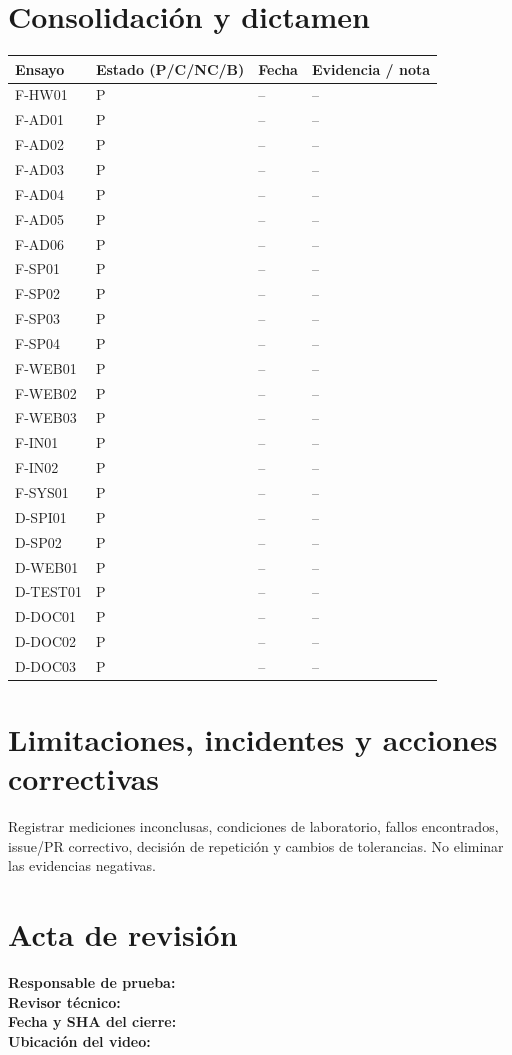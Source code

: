 \documentclass[11pt,a4paper]{article}
\begin{document}
\section{Consolidación y dictamen}
\begin{longtable}{p{20mm}p{24mm}p{20mm}p{72mm}}\toprule
Ensayo & Estado (P/C/NC/B) & Fecha & Evidencia / nota\\\midrule\endhead
F-HW01 & P & -- & --\\
F-AD01 & P & -- & --\\
F-AD02 & P & -- & --\\
F-AD03 & P & -- & --\\
F-AD04 & P & -- & --\\
F-AD05 & P & -- & --\\
F-AD06 & P & -- & --\\
F-SP01 & P & -- & --\\
F-SP02 & P & -- & --\\
F-SP03 & P & -- & --\\
F-SP04 & P & -- & --\\
F-WEB01 & P & -- & --\\
F-WEB02 & P & -- & --\\
F-WEB03 & P & -- & --\\
F-IN01 & P & -- & --\\
F-IN02 & P & -- & --\\
F-SYS01 & P & -- & --\\
D-SPI01 & P & -- & --\\
D-SP02 & P & -- & --\\
D-WEB01 & P & -- & --\\
D-TEST01 & P & -- & --\\
D-DOC01 & P & -- & --\\
D-DOC02 & P & -- & --\\
D-DOC03 & P & -- & --\\
\bottomrule\end{longtable}

\section{Limitaciones, incidentes y acciones correctivas}
Registrar mediciones inconclusas, condiciones de laboratorio, fallos encontrados, issue/PR correctivo, decisión de repetición y cambios de tolerancias. No eliminar las evidencias negativas.

\section{Acta de revisión}
\noindent\textbf{Responsable de prueba:} \underline{\hspace{50mm}}\\
\textbf{Revisor técnico:} \underline{\hspace{50mm}}\\
\textbf{Fecha y SHA del cierre:} \underline{\hspace{55mm}}\\
\textbf{Ubicación del video:} \underline{\hspace{75mm}}
\end{document}
